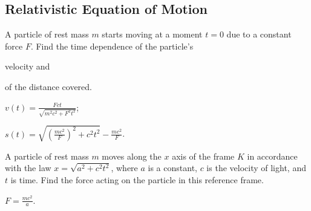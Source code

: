 \subsection{Relativistic Equation of Motion}


\begin{problem}
	A particle of rest mass $m$ starts moving at a moment $t = 0$ due to a constant force $F$. Find the time dependence of the particle's
	\begin{enumerate*}[label=(\alph*)]
		\item  velocity and
		\item of the distance covered.
	\end{enumerate*}
	\begin{solution}
		\begin{enumerate*}[label=(\alph*)]
			\item $v(t) = \frac{Fct}{\sqrt{m^2c^2 + F^2t^2}}$;
			\item $s(t) = \sqrt{\left( \frac{mc^2}{F}\right)^2 + c^2t^2  } - \frac{mc^2}{F}$.
		\end{enumerate*}
	\end{solution}
\end{problem}


\begin{problem}
	A particle of rest mass $m$ moves along the $x$ axis of the frame $K$ in accordance with the law $x = \sqrt{a^2 + c^2t^2} $, where $a$ is a constant, $c$ is the velocity of light, and $t$ is time. Find the force acting on the particle in this reference frame.
	\begin{solution}
		$F = \frac{mc^2}{a}$.
	\end{solution}
\end{problem}



